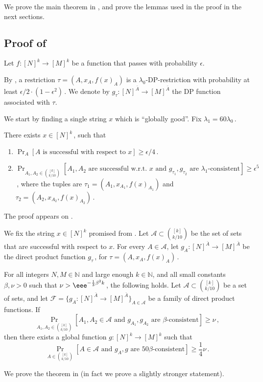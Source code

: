 \documentclass{toc}
\newcommand{\Prob}[2][]{\Pr_{{#1}}\left[#2\right]} %
\newcommand{\set}[1]{\{#1\}} %
\newcommand\f{f} %
\newcommand{\g}{g} %
\newcommand\rest[1]{{\bar{#1}}}  %
\begin{document}
We prove the main theorem in , and prove the lemmas used in the proof in the next sections.
\subsection{Proof of }\label{sec:global proof}
Let $\f:[N]^k\rightarrow[M]^k$ be a function that passes  with probability $\epsilon$.

By , a restriction $\tau=(A,x_A,f(x)_A)$ is a $\lambda_0$-DP-restriction with probability at least  
%
$\epsilon/2 %
\cdot (1-\epsilon^2)$\,. We denote by $g_\tau:[N]^{\rest{A}}\to [M]^{\rest{A}}$ the DP function associated with $\tau$.

We start by finding a single string $x$ which is ``globally good''. Fix $\lambda_1 = 60\lambda_0$\,.
\begin{lemma} \label{lem:cons of local func}
	There exists $x\in[N]^k$\,, such that
	\begin{enumerate}
		\item $\Prob[A]{A \textrm{ is successful with respect to }x} \geq 
		\epsilon/4$\,. %
		\item $\Prob[A_1,A_2\in \binom{[k]}{k/10}]{A_1,A_2 \textrm{ are successful w.r.t. }x \textrm{ and }\g_{\tau_1},\g_{\tau_2} \text{ are } \lambda_1\textrm{-consistent}} \geq \epsilon^5$\,, where the tuples are $\tau_1=(A_1,x_{A_1},\f(x)_{A_1})$ and $\tau_2=(A_2,x_{A_2},\f(x)_{A_2})$\,.
	\end{enumerate}
\end{lemma}
The proof appears on . 

We fix the string $x\in[N]^k$ promised from .  Let $\mathcal{A}\subset \binom{[k]}{k/10}$ be the 
%
set %
of sets that are successful with respect to $x$.
For every $A\in\mathcal{A}$, let $\g_A:[N]^{\rest{A}}\rightarrow[M]^{\rest{A}}$ be the direct product function $\g_\tau$\,, for $\tau = (A,x_A,\f(x)_A)$\,.  

\begin{theorem}\label{thm:sets}
    For all integers $N,M\in\mathbb{N}$ and large enough $k\in\mathbb{N}$, and all small constants $\beta,\nu > 0$ such that $\nu > \eee^{-\frac{1}{3}\beta^2 k}$\,, the following holds.  Let $\mathcal{A}\subset\binom{[k]}{k/10} $ be a 
    set %
    of sets, and let $\mathcal{F}= \set{\g_A:[N]^{\rest{A}}\rightarrow[M]^{\rest{A}}}_{A\in\mathcal{A}}$ be a family of direct product functions. If
    \[ \Pr_{A_1,A_2\in \binom{[k]}{k/10}}[A_1,A_2\in\mathcal{A} \textrm{ and }\g_{A_1},\g_{A_2} \text{ are } \beta\textrm{-consistent}]\geq \nu\,, \] %
    then there exists a global function $\g:[N]^k\rightarrow [M]^k$ such that 
    \[ \Pr_{A\in\binom{[k]}{k/10}}[A\in\mathcal{A} \textrm{ and }\g_A,\g \text{ are } 50\beta \textrm{-consistent}] \geq \frac{1}{4}\nu\,. \]%
\end{theorem} 	
We prove the theorem in  (in fact we prove a slightly stronger statement).
\end{document}
